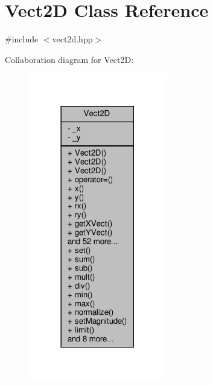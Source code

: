 \hypertarget{classVect2D}{}\section{Vect2D Class Reference}
\label{classVect2D}


{\ttfamily \#include $<$vect2d.\+hpp$>$}



Collaboration diagram for Vect2D\+:\nopagebreak
\begin{figure}[H]
\begin{center}
\leavevmode
\includegraphics[width=170pt]{classVect2D__coll__graph}
\end{center}
\end{figure}
